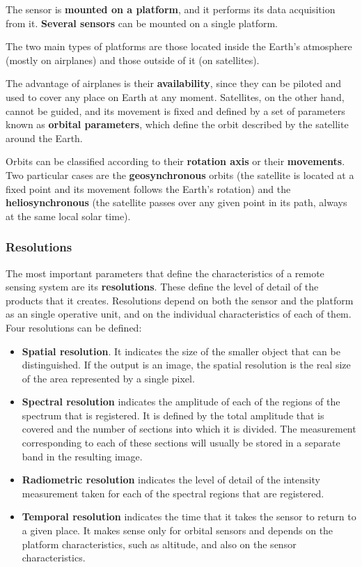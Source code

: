 The sensor is \textbf{mounted on a platform}, and it performs its data acquisition from it. \textbf{Several sensors} can be mounted on a single platform.

The two main types of platforms are those located inside the Earth's atmosphere (mostly on airplanes) and those outside of it (on satellites).

The advantage of airplanes is their \textbf{availability}, since they can be piloted and used to cover any place on Earth at any moment. Satellites, on the other hand, cannot be guided, and its movement is fixed and defined by a set of parameters known as \textbf{orbital parameters}, which define the orbit described by the satellite around the Earth.

Orbits can be classified according to their \textbf{rotation axis} or their \textbf{movements}. Two particular cases are the \textbf{geosynchronous} orbits (the satellite is located at a fixed point and its movement follows the Earth's rotation) and the \textbf{heliosynchronous} (the satellite passes over any given point in its path, always at the same local solar time).
	
\subsubsection{Resolutions}

The most important parameters that define the characteristics of a remote sensing system are its \textbf{resolutions}. These define the level of detail of the products that it creates. Resolutions depend on both the sensor and the platform as an single operative unit, and on the individual characteristics of each of them. Four resolutions can be defined:

\begin{itemize}
	\item \textbf{Spatial resolution}. It indicates the size of the smaller object that can be distinguished. If the output is an image, the spatial resolution is the real size of the area represented by a single pixel.
	\item \textbf{Spectral resolution} indicates the amplitude of each of the regions of the spectrum that is registered. It is defined by the total amplitude that is covered and the number of sections into which it is divided. The measurement corresponding to each of these sections will usually be stored in a separate band in the resulting image. 
	\item \textbf{Radiometric resolution} indicates the level of detail of the intensity measurement taken for each of the spectral regions that are registered. 
	\item \textbf{Temporal resolution} indicates the time that it takes the sensor to return to a given place. It makes sense only for orbital sensors and depends on the platform characteristics, such as altitude, and also on the sensor characteristics.
\end{itemize}

